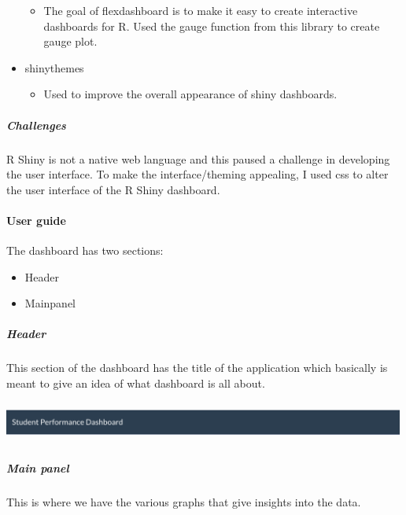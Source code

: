 \documentclass[
]{article}
\providecommand{\tightlist}{%
  \setlength{\itemsep}{0pt}\setlength{\parskip}{0pt}}
\begin{document}
\begin{itemize}
  \begin{itemize}
  \tightlist
  \item
    The goal of flexdashboard is to make it easy to create interactive
    dashboards for R. Used the gauge function from this library to
    create gauge plot.
  \end{itemize}
\item
  shinythemes

  \begin{itemize}
  \tightlist
  \item
    Used to improve the overall appearance of shiny dashboards.
  \end{itemize}
\end{itemize}

\newpage

\hypertarget{challenges}{%
\subparagraph{Challenges}\label{challenges}}

R Shiny is not a native web language and this paused a challenge in
developing the user interface. To make the interface/theming appealing,
I used css to alter the user interface of the R Shiny dashboard.

\hypertarget{user-guide-1}{%
\paragraph{User guide}\label{user-guide-1}}

The dashboard has two sections:

\begin{itemize}
\tightlist
\item
  Header\\
\item
  Mainpanel
\end{itemize}

\hypertarget{header}{%
\subparagraph{Header}\label{header}}

This section of the dashboard has the title of the application which
basically is meant to give an idea of what dashboard is all about.

\includegraphics[width=5.20833in,height=0.52083in]{www/header.png}

\hypertarget{main-panel}{%
\subparagraph{Main panel}\label{main-panel}}

This is where we have the various graphs that give insights into the
data.
\end{document}
